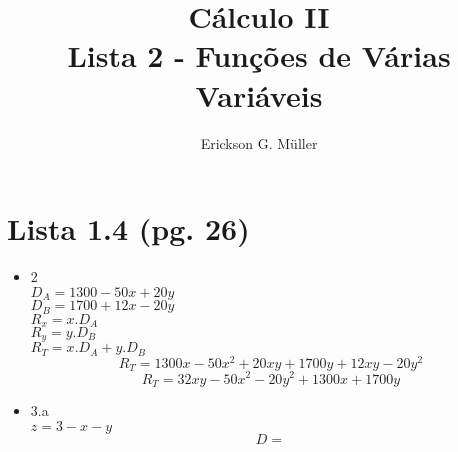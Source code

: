 \documentclass{article}
\title{Cálculo II\\Lista 2 - Funções de Várias Variáveis}
\author{Erickson G. Müller}
\date{}
\begin{document}
\maketitle
\section*{Lista 1.4 (pg. 26)}
	\begin{itemize}
		\item 2
			\\$D_A=1300-50x+20y$
			\\$D_B=1700+12x-20y$
			\\$R_x=x.D_A$
			\\$R_y=y.D_B$
			\\$R_T=x.D_A+y.D_B$
			$$R_T = 1300x-50x^2+20xy+1700y+12xy-20y^2$$
			$$R_T = 32xy-50x^2-20y^2+1300x+1700y$$
		\item 3.a \\$z=3-x-y$ %
			$$D=$$
	\end{itemize}
%
\end{document}

